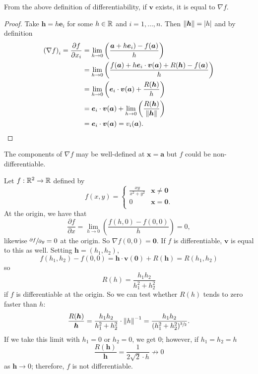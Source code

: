 \begin{theorem}
    From the above definition of differentiability, if $\bm v$ exists, it is equal to $\nabla f$.
\end{theorem}

\begin{proof}
    Take $\bm h = h \bm e_i$ for some $h \in \mathbb{R}$ and $i = 1, \ldots, n$. Then $\left\lVert\bm h\right\rVert = \lvert h \rvert$ and by definition
    \begin{align*}
        \left( \nabla f \right)_i = \frac{\partial f}{\partial x_i} &= \lim_{h \to 0} \left(\frac{\bm a + h\bm e_i) - f(\bm a)}{h}\right) \\
        &= \lim_{h \to 0} \left( \frac{f(\bm a) + h\bm e_i \cdot \bm v(\bm a) + R(\bm h) - f(\bm a)}{h} \right) \\
        &= \lim_{h \to 0} \left( \bm e_i \cdot \bm v(\bm a) + \frac{R(\bm h)}{h} \right) \\
        &= \bm e_i \cdot \bm v(\bm a) + \lim_{h \to 0} \left(\frac{R(\bm h)}{\left\lVert\bm h\right\rVert} \right) \\
        &= \bm e_i \cdot \bm v(\bm a) = v_i(\bm a).
    \end{align*}
\end{proof}

\begin{remark}
    The components of $\nabla f$ may be well-defined at $\bm x = \bm a$ but $f$ could be non-differentiable.
\end{remark}

\begin{example}
    Let $f:\mathbb{R}^2 \to \mathbb{R}$ defined by
    \[ 
        f(x, y) = 
        \begin{cases}
            \frac{xy}{x^2 + y^2} & \bm x \neq \bm 0 \\
            0                    & \bm x = \bm 0. \\
        \end{cases}
    \]
    At the origin, we have that
    \[ \frac{\partial f}{\partial x} = \lim_{h \to 0} \left( \frac{f(h, 0) - f(0,0)}{h} \right) = 0, \]
    likewise $\sfrac{\partial f}{\partial y} = 0$ at the origin. So $\nabla f(0,0) = \bm 0$. If $f$ is differentiable, $\bm v$ is equal to this as well. Setting $\bm h = (h_1, h_2)$,
    \[ f(h_1, h_2) - f(0,0) = \bm h \cdot \bm v(\bm 0) + R(\bm h) = R(h_1, h_2) \]
    so
    \[ R(h) = \frac{h_1h_2}{h_1^2 + h_2^2} \]
    if $f$ is differentiable at the origin. So we can test whether $R(h)$ tends to zero faster than $h$:
    \[ \frac{R(\bm h)}{\bm h} = \frac{h_1h_2}{h_1^2 + h_2^2} \cdot \left\lVert h\right\rVert^{-1} = \frac{h_1h_2}{(h_1^2 + h_2^2)^{\sfrac32}}. \]
    If we take this limit with $h_1 = 0$ or $h_2 = 0$, we get $0$; however, if $h_1 = h_2 = h$ 
    \[ \frac{R(\bm h)}{\bm h} = \frac{1}{2\sqrt 2 \cdot h} \not \to 0\]
    as $\bm h \to 0$; therefore, $f$ is not differentiable.
\end{example}
